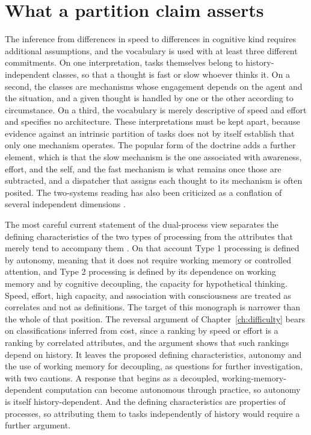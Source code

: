 \documentclass[11pt]{report}
\theoremstyle{remark}
\theoremstyle{definition}
\begin{document}
\section{What a partition claim asserts}

The inference from differences in speed to differences in cognitive kind requires additional assumptions, and the vocabulary is used with at least three different commitments. On one interpretation, tasks themselves belong to history-independent classes, so that a thought is fast or slow whoever thinks it. On a second, the classes are mechanisms whose engagement depends on the agent and the situation, and a given thought is handled by one or the other according to circumstance. On a third, the vocabulary is merely descriptive of speed and effort and specifies no architecture. These interpretations must be kept apart, because evidence against an intrinsic partition of tasks does not by itself establish that only one mechanism operates. The popular form of the doctrine adds a further element, which is that the slow mechanism is the one associated with awareness, effort, and the self, and the fast mechanism is what remains once those are subtracted, and a dispatcher that assigns each thought to its mechanism is often posited. The two-systems reading has also been criticized as a conflation of several independent dimensions \cite{keren2009,melnikoff2018}.

The most careful current statement of the dual-process view separates the defining characteristics of the two types of processing from the attributes that merely tend to accompany them \cite{evans2013}. On that account Type 1 processing is defined by autonomy, meaning that it does not require working memory or controlled attention, and Type 2 processing is defined by its dependence on working memory and by cognitive decoupling, the capacity for hypothetical thinking. Speed, effort, high capacity, and association with consciousness are treated as correlates and not as definitions. The target of this monograph is narrower than the whole of that position. The reversal argument of Chapter~\ref{ch:difficulty} bears on classifications inferred from cost, since a ranking by speed or effort is a ranking by correlated attributes, and the argument shows that such rankings depend on history. It leaves the proposed defining characteristics, autonomy and the use of working memory for decoupling, as questions for further investigation, with two cautions. A response that begins as a decoupled, working-memory-dependent computation can become autonomous through practice, so autonomy is itself history-dependent. And the defining characteristics are properties of processes, so attributing them to tasks independently of history would require a further argument.
\end{document}
